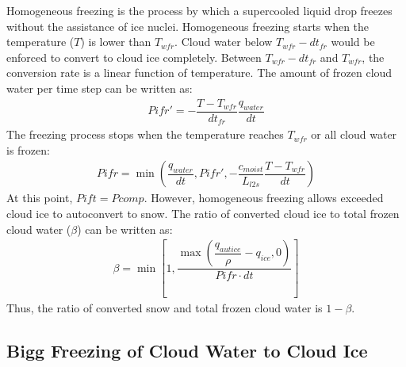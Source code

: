 \documentclass[letterpaper,titlepage,10pt]{article}
\numberwithin{equation}{section}
\begin{document}
Homogeneous freezing is the process by which a supercooled liquid drop freezes without the assistance of ice nuclei. Homogeneous freezing starts when the temperature ($T$) is lower than $T_{wfr}$. Cloud water below $T_{wfr} - dt_{fr}$ would be enforced to convert to cloud ice completely. Between $T_{wfr} - dt_{fr}$ and $T_{wfr}$, the conversion rate is a linear function of temperature. The amount of frozen cloud water per time step can be written as:
\begin{gather}
	Pifr' = - \dfrac{T - T_{wfr}}{dt_{fr}} \dfrac{q_{water}}{dt}
\end{gather}
The freezing process stops when the temperature reaches $T_{wfr}$ or all cloud water is frozen:
\begin{gather}
	Pifr = \min \left(\dfrac{q_{water}}{dt}, Pifr', - \dfrac{c_{moist}}{L_{l2s}} \dfrac{T - T_{wfr}}{dt} \right)
\end{gather} 
At this point, $Pift = Pcomp$. However, homogeneous freezing allows exceeded cloud ice to autoconvert to snow. The ratio of converted cloud ice to total frozen cloud water ($\beta$) can be written as:
\begin{gather}
	\beta = \min \left[1, \dfrac{\max \left(\dfrac{q_{autice}}{\rho} - q_{ice}, 0 \right)}{Pifr \cdot dt} \right]
\end{gather}
Thus, the ratio of converted snow and total frozen cloud water is $1 - \beta$. 


\subsection{Bigg Freezing of Cloud Water to Cloud Ice}
\end{document}
